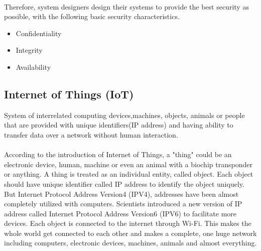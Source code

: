 \paragraph{}
Therefore, system designers design their systems to provide the best security as possible, with the following basic security characteristics.
	\begin{center}
		\begin{itemize}
			\item Confidentiality
			\item Integrity
			\item Availability
		\end{itemize}
	\end{center}

\subsection{Internet of Things (IoT)}
System of interrelated computing devices,machines, objects, animals or people that are provided with unique identifiers(IP address) and having ability to transfer data over a network without human interaction.\cite{iot}

\paragraph{}
According to the introduction of Internet of Things, a "thing" could be an electronic device, human, machine or even an animal with a biochip transponder or anything. A thing is treated as an individual entity, called object. Each object should have unique identifier called IP address to identify the object uniquely. But Internet Protocol Address Version4 (IPV4), addresses have been almost completely utilized with computers. Scientists introduced a new version of IP address called Internet Protocol Address Version6 (IPV6) to facilitate more devices. Each object is connected to the internet through Wi-Fi. This makes the whole world get connected to each other and makes a complete, one huge network including computers, electronic devices, machines, animals and almost everything. 

